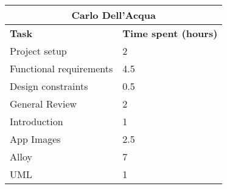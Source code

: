 \begin{table}[h]
  \centering
  \begin{tabular}{l|l}
    \multicolumn{2}{c}{\textbf{Carlo Dell'Acqua}} \\
    \hline
    \textbf{Task} & \textbf{Time spent (hours)}\\
    \hline
    Project setup & 2 \\
    Functional requirements & 4.5 \\
    Design constraints & 0.5 \\
    General Review & 2 \\
    Introduction & 1 \\
    App Images & 2.5 \\
    Alloy & 7 \\
    UML & 1 \\
  \end{tabular}
\end{table}
